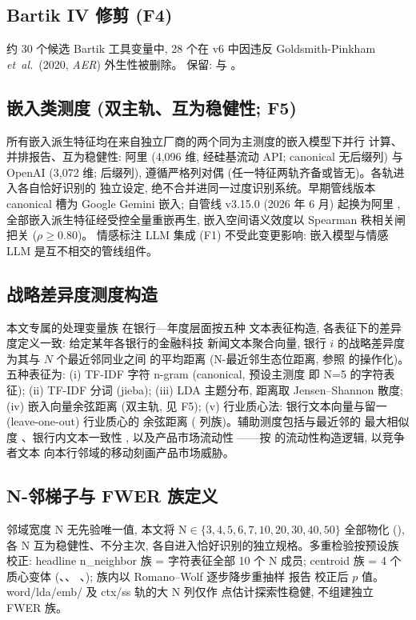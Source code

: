 \subsection{Bartik IV 修剪 (F4)}
约 30 个候选 Bartik 工具变量中, 28 个在 v6 中因违反
Goldsmith-Pinkham \emph{et~al.}\ (2020, \emph{AER}) 外生性被删除。
保留:  与 。

\subsection{嵌入类测度 (双主轨、互为稳健性; F5)}
所有嵌入派生特征均在来自独立厂商的两个同为主测度的嵌入模型下并行
计算、并排报告、互为稳健性: 阿里 
(4{,}096 维, 经硅基流动 API; canonical 无后缀列) 与 OpenAI
 (3{,}072 维;  后缀列),
遵循严格列对偶 (任一特征两轨齐备或皆无)。各轨进入各自恰好识别的
独立设定, 绝不合并进同一过度识别系统。早期管线版本 canonical 槽为
Google Gemini 嵌入; 自管线 v3.15.0 (2026 年 6 月) 起换为阿里
, 全部嵌入派生特征经受控全量重嵌再生,
嵌入空间语义效度以 Spearman 秩相关闸把关 ($\rho \geq 0.80$)。
情感标注 LLM 集成 (F1) 不受此变更影响: 嵌入模型与情感 LLM
是互不相交的管线组件。

\subsection{战略差异度测度构造}\label{sec:method-stratdiff}
本文专属的处理变量族  在银行—年度层面按五种
文本表征构造, 各表征下的差异度定义一致: 给定某年各银行的金融科技
新闻文本聚合向量, 银行 $i$ 的战略差异度为其与 $N$ 个最近邻同业之间
的平均距离 (N-最近邻生态位距离, 参照 \textcite{guzman2023strategy}
的操作化)。五种表征为: (i) TF-IDF 字符 n-gram (canonical,
预设主测度  即 N=5 的字符表征);
(ii) TF-IDF 分词 (jieba); (iii) LDA 主题分布, 距离取
Jensen--Shannon 散度; (iv) 嵌入向量余弦距离 (双主轨, 见 F5);
(v) 行业质心法: 银行文本向量与留一 (leave-one-out) 行业质心的
余弦距离 ( 列族)。辅助测度包括与最近邻的
最大相似度 、银行内文本一致性
, 以及产品市场流动性 
——按 \textcite{hoberg2014fluidity} 的流动性构造逻辑, 以竞争者文本
向本行邻域的移动刻画产品市场威胁。

\subsection{N-邻梯子与 FWER 族定义}\label{sec:method-fwer}
邻域宽度 N 无先验唯一值, 本文将 N$\in\{3,4,5,6,7,10,20,30,40,50\}$
全部物化 (), 各 N 互为稳健性、不分主次,
各自进入恰好识别的独立规格。多重检验按预设族校正: headline
n\_neighbor 族 = 字符表征全部 10 个 N 成员; centroid 族 = 4 个
质心变体 (、、
、); 族内以
Romano--Wolf 逐步降步重抽样 \parencite{romano2005stepwise} 报告
校正后 $p$ 值。word/lda/emb/ 及 ctx/ss 轨的大 N 列仅作
点估计探索性稳健, 不组建独立 FWER 族。

